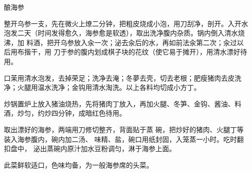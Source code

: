 \begin{recipe}[一品海参]{酿海参}

\ingredients


\preparation

\step 整开乌参一支，先在微火上燎二分钟，把粗皮烧成小泡，用刀刮净，剖开。入开水
泡发二天（时间发得愈久，海参愈是软透），取出洗净腹内杂质。锅内倒入清水烧沸，加
料酒，把开乌参放入汆一次；泌去汆后的水，再如前法汆第二次；汆过以后用布揩干，用
刀于参的腹内划成棋子块的花纹（使它易于摊开），用清水漂好待用。

\step 口茉用清水泡发，去掉荣足；洗净去淹；冬夢去壳，切去老根；肥瘦猪肉去皮洗
净；火腿用温水洗净；金钩用清水淘洗。以上各料均切成小方丁。

\step 炒锅置炉上放入猪油烧热，先将猪肉丁放入，再加火腿、冬笋、金钩、酱油、料
酒，炒匀，约炒四分钟，成暗红色待用。

\step 取出漂好的海参，两端用刀修切整齐，背面贴于蒸 碗，把炒好的猪肉、火腿丁等
装入海参腹内，碗内加二汤、 味精、盐，碗口用纸封固，入笼蒸一小时。吃时翻扣盘中，
泌出蒸碗内原汁加水豆粉调匀，淋于海参上面。

\features

此菜鲜软适口，色味均备，为一般海参席的头菜。

\end{recipe}

